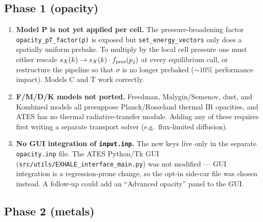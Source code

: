 \documentclass[english,a4paper]{my_memo}
\begin{document}
\subsection{Phase 1 (opacity)}

\begin{enumerate}
\item \textbf{Model P is not yet applied per cell.} The pressure-broadening
factor \texttt{opacity\_pT\_factor(p)} is exposed but
\texttt{set\_energy\_vectors} only does a spatially uniform prebake. To
multiply by the local cell pressure one must either rescale
$s_X(k) \to s_X(k) \cdot f_{\rm pres}(p_j)$ at every equilibrium call, or
restructure the pipeline so that $\sigma$ is no longer prebaked
($\sim 10\%$ performance impact). Models C and T work correctly.

\item \textbf{F/M/D/K models not ported.} Freedman, Malygin/Semenov, dust,
and Kombined models all presuppose Planck/Rosseland thermal IR opacities,
and ATES has no thermal radiative-transfer module. Adding any of these
requires first writing a separate transport solver (e.g.\ flux-limited
diffusion).

\item \textbf{No GUI integration of \texttt{input.inp}.} The new keys live
only in the separate \texttt{opacity.inp} file. The ATES Python/Tk GUI
(\texttt{src/utils/EXHALE\_interface\_main.py}) was not modified --- GUI
integration is a regression-prone change, so the opt-in side-car file was
chosen instead. A follow-up could add an ``Advanced opacity'' panel to the
GUI.
\end{enumerate}

\subsection{Phase 2 (metals)}
\end{document}
